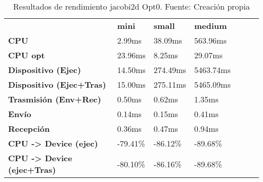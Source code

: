 \begin{table}[H]
    \centering
    \begin{tabular}{lllllll}
    \rowcolor[HTML]{DAE8FC} \ &  \textbf{mini} &  \textbf{	small} &  \textbf{	medium} \\
    \cellcolor[HTML]{DAE8FC} \textbf{CPU} & 2.99ms & 	38.09ms & 	563.96ms \\
    \rowcolor[HTML]{EFEFEF} \cellcolor[HTML]{DAE8FC} \textbf{CPU opt} & 23.96ms & 	8.25ms & 	29.07ms \\
    \cellcolor[HTML]{DAE8FC} \textbf{Dispositivo (Ejec)} & 14.50ms & 	274.49ms & 	5463.74ms \\
    \rowcolor[HTML]{EFEFEF} \cellcolor[HTML]{DAE8FC} \textbf{Dispositivo (Ejec+Tras)} & 15.00ms & 	275.11ms & 	5465.09ms \\
    \cellcolor[HTML]{DAE8FC} \textbf{Trasmisión (Env+Rec)} & 0.50ms & 	0.62ms & 	1.35ms \\
    \rowcolor[HTML]{EFEFEF} \cellcolor[HTML]{DAE8FC} \textbf{Envío} & 0.14ms & 	0.15ms & 	0.41ms \\
    \cellcolor[HTML]{DAE8FC} \textbf{Recepción} & 0.36ms & 	0.47ms & 	0.94ms \\
    \rowcolor[HTML]{EFEFEF} \cellcolor[HTML]{DAE8FC} \textbf{CPU -> Device (ejec)} & -79.41\% & 	-86.12\% & 	-89.68\% \\
    \cellcolor[HTML]{DAE8FC} \textbf{CPU -> Device (ejec+Tras)} & -80.10\% & 	-86.16\% & 	-89.68\% \\
    \end{tabular}
    \caption[Resultados de rendimiento jacobi2d Opt0]{{Resultados de rendimiento jacobi2d Opt0. Fuente: Creación propia}}
    \label{table_test_jacobi2d_Opt0_hw_performanceResults}
\end{table}